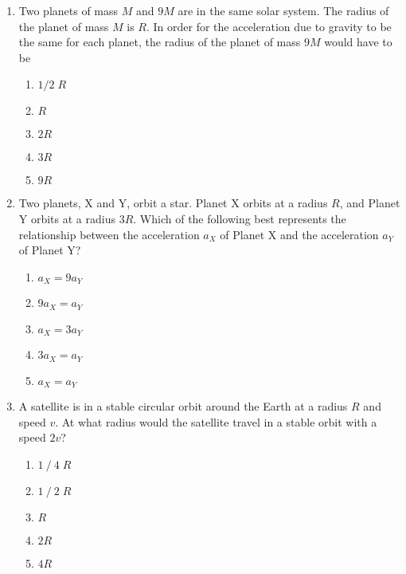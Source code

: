 \documentclass[12pt]{article}
\begin{document}
\begin{enumerate}[leftmargin=50pt,label=\underline{\hspace{0.4in}} \arabic*.]
\item Two planets of mass $M$ and $9M$ are in the same solar system. The
  radius of the planet of mass $M$ is $R$. In order for the acceleration due to
  gravity to be the same for each planet, the radius of the planet of mass
  $9M$ would have to be
  \begin{enumerate}[noitemsep,topsep=0pt,leftmargin=18pt]
  \item $1/2\;R$
  \item $R$
  \item $2R$
  \item $3R$
  \item $9R$
  \end{enumerate}
  \vspace{-0.5in}
  \begin{center}
  \end{center}
\item Two planets, X and Y, orbit a star. Planet X orbits at a radius $R$, and
  Planet Y orbits at a radius $3R$. Which of the following best represents
  the relationship between the acceleration $a_X$ of Planet X and the
  acceleration $a_Y$ of Planet Y?
  \begin{enumerate}[noitemsep,topsep=0pt,leftmargin=18pt]  
  \item $a_X = 9a_Y$
  \item $9a_X = a_Y$
  \item $a_X = 3a_Y$
  \item $3a_X = a_Y$
  \item $a_X = a_Y$
  \end{enumerate}
\item A satellite is in a stable circular orbit around the Earth at a radius $R$
  and speed $v$. At what radius would the satellite travel in a stable orbit
  with a speed $2v$?
  \begin{enumerate}[noitemsep,topsep=0pt,leftmargin=18pt]  
  \item $1⁄4\;R$
  \item $1⁄2\;R$
  \item $R$
  \item $2R$
  \item $4R$
  \end{enumerate}


\end{enumerate}
\end{document}
